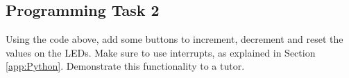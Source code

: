 \subsection{Programming Task 2}
Using the code above, add some buttons to increment, decrement and reset the values on the LEDs. Make sure to use interrupts, as explained in Section \ref{app:Python}. Demonstrate this functionality to a tutor.


